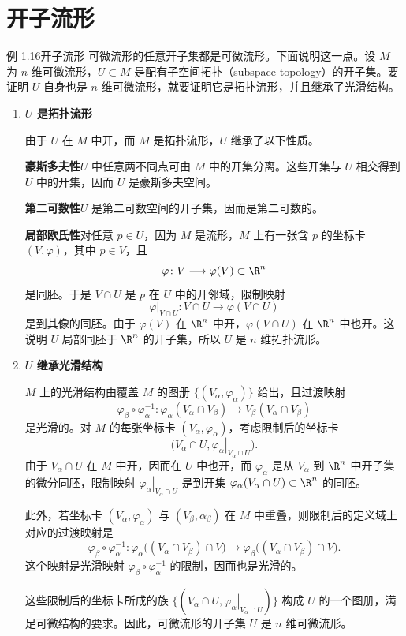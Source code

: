 \section{开子流形}
\begin{statement}{例 1.16}{开子流形}
可微流形的任意开子集都是可微流形。下面说明这一点。设 $M$ 为 $n$ 维可微流形，$U\subset M$ 是配有子空间拓扑（subspace topology）的开子集。要证明 $U$ 自身也是 $n$ 维可微流形，就要证明它是拓扑流形，并且继承了光滑结构。

\begin{enumerate}
  \item \textbf{$U$ 是拓扑流形}

  由于 $U$ 在 $M$ 中开，而 $M$ 是拓扑流形，$U$ 继承了以下性质。

  \textbf{豪斯多夫性}\quad $U$ 中任意两不同点可由 $M$ 中的开集分离。这些开集与 $U$ 相交得到 $U$ 中的开集，因而 $U$ 是豪斯多夫空间。

  \textbf{第二可数性}\quad $U$ 是第二可数空间的开子集，因而是第二可数的。

  \textbf{局部欧氏性}\quad 对任意 $p\in U$，因为 $M$ 是流形，$M$ 上有一张含 $p$ 的坐标卡 $(V,\varphi)$，其中 $p\in V$，且
  \[
    \varphi\colon V\longrightarrow\varphi(V)\subset\R^n
  \]
  是同胚。于是 $V\cap U$ 是 $p$ 在 $U$ 中的开邻域，限制映射
  \[
    \left.\varphi\right|_{V\cap U}\colon V\cap U\longrightarrow\varphi(V\cap U)
  \]
  是到其像的同胚。由于 $\varphi(V)$ 在 $\R^n$ 中开，$\varphi(V\cap U)$ 在 $\R^n$ 中也开。这说明 $U$ 局部同胚于 $\R^n$ 的开子集，所以 $U$ 是 $n$ 维拓扑流形。

  \item \textbf{$U$ 继承光滑结构}

  $M$ 上的光滑结构由覆盖 $M$ 的图册 $\{(V_\alpha,\varphi_\alpha)\}$ 给出，且过渡映射
  \[
    \varphi_\beta\circ\varphi_\alpha^{-1}\colon
    \varphi_\alpha(V_\alpha\cap V_\beta)\longrightarrow V_\beta(V_\alpha\cap V_\beta)
  \]
  是光滑的。对 $M$ 的每张坐标卡 $(V_\alpha,\varphi_\alpha)$，考虑限制后的坐标卡
  \[
    \bigl(V_\alpha\cap U,\left.\varphi_\alpha\right|_{V_\alpha\cap U}\bigr).
  \]
  由于 $V_\alpha\cap U$ 在 $M$ 中开，因而在 $U$ 中也开，而 $\varphi_\alpha$ 是从 $V_\alpha$ 到 $\R^n$ 中开子集的微分同胚，限制映射 $\left.\varphi_\alpha\right|_{V_\alpha\cap U}$ 是到开集 $\varphi_\alpha(V_\alpha\cap U)\subset\R^n$ 的同胚。

  此外，若坐标卡 $(V_\alpha,\varphi_\alpha)$ 与 $(V_\beta,\alpha_\beta)$ 在 $M$ 中重叠，则限制后的定义域上对应的过渡映射是
  \[
    \varphi_\beta\circ\varphi_\alpha^{-1}\colon
    \varphi_\alpha\bigl((V_\alpha\cap V_\beta)\cap V\bigr)
    \longrightarrow
    \varphi_\beta\bigl((V_\alpha\cap V_\beta)\cap V\bigr).
  \]
  这个映射是光滑映射 $\varphi_\beta\circ\varphi_\alpha^{-1}$ 的限制，因而也是光滑的。

  这些限制后的坐标卡所成的族
  $\{(V_\alpha\cap U,\left.\varphi_\alpha\right|_{V_\alpha\cap U})\}$
  构成 $U$ 的一个图册，满足可微结构的要求。因此，可微流形的开子集 $U$ 是 $n$ 维可微流形。
\end{enumerate}
\end{statement}

